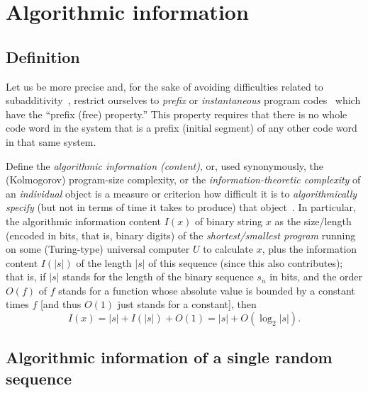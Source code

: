 \section{Algorithmic information}

\subsection{Definition}

Let us be more precise and, for the sake of avoiding difficulties related to subadditivity~\cite{chaitin-ait-82-handbook},
restrict ourselves to {\em prefix} or {\em instantaneous} program codes~\cite{levin,ch:75}
which have the ``prefix (free) property.''
This property requires that there is no whole code word in the system that is a prefix (initial segment) of any other code word in that same system.

Define the
{\em algorithmic information (content)},
or, used synonymously, the (Kolmogorov)  program-size complexity,
or the {\em information-theoretic complexity}
of an {\em individual}
object is a measure or criterion how difficult it is to {\em algorithmically specify} (but not in terms of time it takes to  produce) that object~\cite{chaitin-ait-82-handbook}.
In particular,
the algorithmic information content $I(x)$ of
binary string $x$
as the size/length (encoded in bits, that is, binary digits) of the
{\em shortest/smallest program} running on some (Turing-type) universal computer $U$ to calculate $x$, plus the information content
$ I( \vert s \vert )$ of the length $\vert s \vert $ of this sequence (since this also contributes); that is, if $\vert s \vert$ stands
for the length of the binary sequence $s_n$ in bits, and the order
$O(f)$ of $f$ stands for a function whose absolute value is bounded by a constant times $f$ [and thus $O(1)$ just stands for a constant], then
\begin{equation}
I(x) =\vert s \vert + I( \vert s \vert ) + O(1)  =  \vert s \vert + O( \log_2 \vert s\vert ).
\end{equation}


\subsection{Algorithmic information of a single random sequence}

